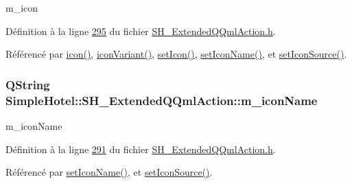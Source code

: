 m\-\_\-icon 



Définition à la ligne \hyperlink{SH__ExtendedQQmlAction_8h_source_l00295}{295} du fichier \hyperlink{SH__ExtendedQQmlAction_8h_source}{S\-H\-\_\-\-Extended\-Q\-Qml\-Action.\-h}.



Référencé par \hyperlink{classSimpleHotel_1_1SH__ExtendedQQmlAction_a6a8bbcd5a320fae95b3bd85f553c7915}{icon()}, \hyperlink{classSimpleHotel_1_1SH__ExtendedQQmlAction_a14fa0d2554a8f31be0a57a4c8fd1ff74}{icon\-Variant()}, \hyperlink{classSimpleHotel_1_1SH__ExtendedQQmlAction_a44c9dc0a8bed100b5cc935014b073593}{set\-Icon()}, \hyperlink{classSimpleHotel_1_1SH__ExtendedQQmlAction_ae989680dffcc6e86e5ff686136d787a3}{set\-Icon\-Name()}, et \hyperlink{classSimpleHotel_1_1SH__ExtendedQQmlAction_af81c3330e02238f5cbfe5d5b287695ab}{set\-Icon\-Source()}.

\hypertarget{classSimpleHotel_1_1SH__ExtendedQQmlAction_a8fce5a42c750f051070411e0aa394b6b}{
\subsubsection[{m\-\_\-icon\-Name}]{\setlength{\rightskip}{0pt plus 5cm}Q\-String Simple\-Hotel\-::\-S\-H\-\_\-\-Extended\-Q\-Qml\-Action\-::m\-\_\-icon\-Name\hspace{0.3cm}{\ttfamily [private]}}}\label{classSimpleHotel_1_1SH__ExtendedQQmlAction_a8fce5a42c750f051070411e0aa394b6b}


m\-\_\-icon\-Name 



Définition à la ligne \hyperlink{SH__ExtendedQQmlAction_8h_source_l00291}{291} du fichier \hyperlink{SH__ExtendedQQmlAction_8h_source}{S\-H\-\_\-\-Extended\-Q\-Qml\-Action.\-h}.



Référencé par \hyperlink{classSimpleHotel_1_1SH__ExtendedQQmlAction_ae989680dffcc6e86e5ff686136d787a3}{set\-Icon\-Name()}, et \hyperlink{classSimpleHotel_1_1SH__ExtendedQQmlAction_af81c3330e02238f5cbfe5d5b287695ab}{set\-Icon\-Source()}.

